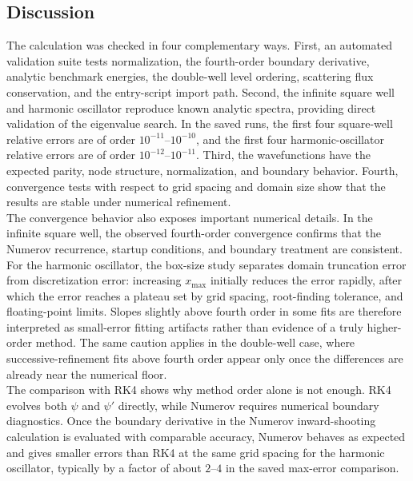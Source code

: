 \documentclass[11pt]{article}
\begin{document}
\begin{refsection}
    \section{Discussion}
        The calculation was checked in four complementary ways. First, an automated validation suite tests normalization, the fourth-order boundary derivative, analytic benchmark energies, the double-well level ordering, scattering flux conservation, and the entry-script import path. Second, the infinite square well and harmonic oscillator reproduce known analytic spectra, providing direct validation of the eigenvalue search. In the saved runs, the first four square-well relative errors are of order $10^{-11}$--$10^{-10}$, and the first four harmonic-oscillator relative errors are of order $10^{-12}$--$10^{-11}$. Third, the wavefunctions have the expected parity, node structure, normalization, and boundary behavior. Fourth, convergence tests with respect to grid spacing and domain size show that the results are stable under numerical refinement. \\

        The convergence behavior also exposes important numerical details. In the infinite square well, the observed fourth-order convergence confirms that the Numerov recurrence, startup conditions, and boundary treatment are consistent. For the harmonic oscillator, the box-size study separates domain truncation error from discretization error: increasing $x_{\max}$ initially reduces the error rapidly, after which the error reaches a plateau set by grid spacing, root-finding tolerance, and floating-point limits. Slopes slightly above fourth order in some fits are therefore interpreted as small-error fitting artifacts rather than evidence of a truly higher-order method. The same caution applies in the double-well case, where successive-refinement fits above fourth order appear only once the differences are already near the numerical floor. \\

        The comparison with RK4 shows why method order alone is not enough. RK4 evolves both $\psi$ and $\psi'$ directly, while Numerov requires numerical boundary diagnostics. Once the boundary derivative in the Numerov inward-shooting calculation is evaluated with comparable accuracy, Numerov behaves as expected and gives smaller errors than RK4 at the same grid spacing for the harmonic oscillator, typically by a factor of about $2$--$4$ in the saved max-error comparison. \\


\end{refsection}
\end{document}
